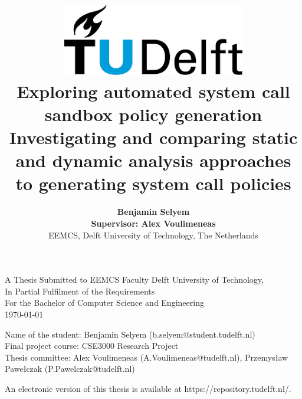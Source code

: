 \title{
    \includegraphics[width=8cm, keepaspectratio]{tudelftlogo.png}\\
    \vspace*{2cm}
    \textbf{
        Exploring automated system call sandbox policy generation\\
        {\large Investigating and comparing static and dynamic analysis approaches to generating system call policies}
    }\\
    \vspace*{1cm}
}

\author{
    \textbf{
Benjamin Selyem}\\
    \hfill \break
    \textbf{Supervisor: Alex Voulimeneas}\\
    \break
    {\large 
        \hfill \break
        EEMCS, Delft University of Technology, The Netherlands
    }\\
}

\date{}

\maketitle
\thispagestyle{empty}

\let\clearpagebackup\clearpage
\renewcommand{\clearpage}{ }

\onecolumn

\vspace*{1.5cm}
\begin{center}
    A Thesis Submitted to EEMCS Faculty Delft University of Technology,\\
    In Partial Fulfilment of the Requirements\\
    For the Bachelor of Computer Science and Engineering\\
    \today
\end{center}

\vspace*{2cm}

\noindent
{\small
Name of the student: Benjamin Selyem (b.selyem@student.tudelft.nl)\\
Final project course: CSE3000 Research Project\\
Thesis committee: Alex Voulimeneas (A.Voulimeneas@tudelft.nl), Przemysław Pawełczak (P.Pawelczak@tudelft.nl)\\
}
\vfill

\begin{center}
    An electronic version of this thesis is available at https://repository.tudelft.nl/.
\end{center}

\twocolumn
\let\clearpage\clearpagebackup  
\clearpage
\setcounter{page}{1}
